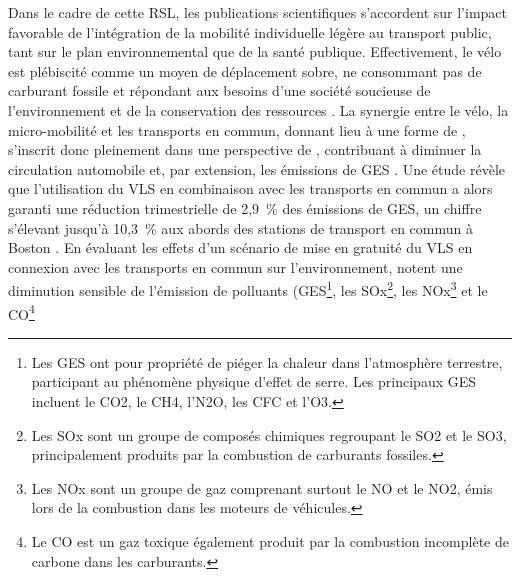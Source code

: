 \begin{refsegment}
Dans le cadre de cette \acrshort{RSL}, les publications scientifiques s'accordent sur l'impact favorable de l'intégration de la mobilité individuelle légère au transport public, tant sur le plan environnemental que de la santé publique. Effectivement, le vélo est plébiscité comme un moyen de déplacement sobre, ne consommant pas de carburant fossile et répondant aux besoins d'une société soucieuse de l'environnement et de la conservation des ressources \textcolor{blue}{\autocite[1~935]{chen_study_2013}}. La synergie entre le vélo, la micro-mobilité et les transports en commun, donnant lieu à une forme de , s'inscrit donc pleinement dans une perspective de , contribuant à diminuer la circulation automobile et, par extension, les émissions de \acrshort{GES} \textcolor{blue}{\autocites[4]{kostrzewska_towards_2017}[3~111]{cho_estimation_2022}}. Une étude révèle que l'utilisation du \acrshort{VLS} en combinaison avec les transports en commun a alors garanti une réduction trimestrielle de 2,9~\% des émissions de \acrshort{GES}, un chiffre s'élevant jusqu'à 10,3~\% aux abords des stations de transport en commun à Boston \textcolor{blue}{\autocite[11-12]{basu_planning_2021}}. En évaluant les effets d'un scénario de mise en gratuité du \acrshort{VLS} en connexion avec les transports en commun sur l'environnement, \textcolor{blue}{\textcite[49]{lu_improving_2018}} notent une diminution sensible de l'émission de polluants (\acrshort{GES}\footnote{
    Les \acrshort{GES} ont pour propriété de piéger la chaleur dans l'atmosphère terrestre, participant au phénomène physique d'effet de serre. Les principaux \acrshort{GES} incluent le  \acrfull{CO2}, le \acrfull{CH4}, l'\acrfull{N2O}, les \acrfull{CFC} et l'\acrfull{O3}.
}, les \acrfull{SOx}\footnote{
    Les \acrfull{SOx} sont un groupe de composés chimiques regroupant le \acrfull{SO2} et le \acrfull{SO3}, principalement produits par la combustion de carburants fossiles.
}, les \acrfull{NOx}\footnote{
    Les \acrfull{NOx} sont un groupe de gaz comprenant surtout le \acrfull{NO} et le \acrfull{NO2}, émis lors de la combustion dans les moteurs de véhicules.
} et le \acrfull{CO}\footnote{
    Le \acrfull{CO} est un gaz toxique également produit par la combustion incomplète de carbone dans les carburants.
}
\end{refsegment}
